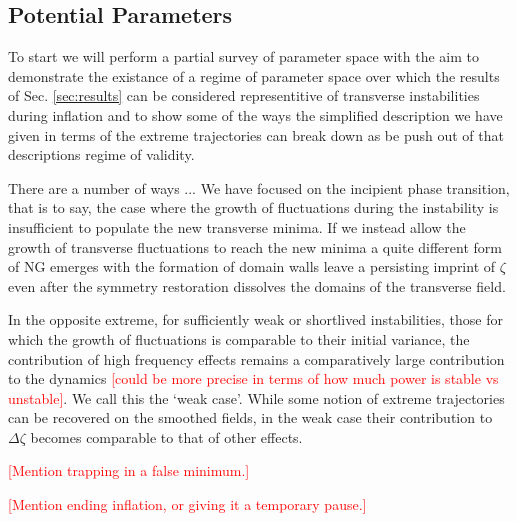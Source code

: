 \subsection{Potential Parameters}

To start we will perform a partial survey of parameter space with the aim to demonstrate the existance of a regime of parameter space over which the results of Sec. \ref{sec:results} can be considered representitive of transverse instabilities during inflation and to show some of the ways the simplified description we have given in terms of the extreme trajectories can break down as be push out of that descriptions regime of validity.

There are a number of ways ...
We have focused on the incipient phase transition, that is to say, the case where the growth of fluctuations during the instability is insufficient to populate the new transverse minima. If we instead allow the growth of transverse fluctuations to reach the new minima a quite different form of NG emerges with the formation of domain walls leave a persisting imprint of $\zeta$ even after the symmetry restoration dissolves the domains of the transverse field.

In the opposite extreme, for sufficiently weak or shortlived instabilities, those for which the growth of fluctuations is comparable to their initial variance, the contribution of high frequency effects remains a comparatively large contribution to the dynamics \textcolor{red}{[could be more precise in terms of how much power is stable vs unstable]}.
We call this the `weak case'.
While some notion of extreme trajectories can be recovered on the smoothed fields, in the weak case their contribution to $\Delta\zeta$ becomes comparable to that of other effects.

\textcolor{red}{[Mention trapping in a false minimum.]}

\textcolor{red}{[Mention ending inflation, or giving it a temporary pause.]}

